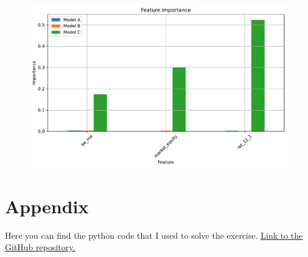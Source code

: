 \documentclass[hidelinks,12pt]{article}
\begin{document}
\FloatBarrier

\section{}
\begin{table}[htbp]
    \centering
    \caption{}
    \resizebox{!}{!}{}
\end{table}

\section{}

\begin{figure}[htbp]
    \centering
    \includegraphics[width=.75\textwidth]{out/4.pdf}
\end{figure}

\section{}
\subsection{}
\begin{table}[htbp]
    \centering
    \caption{}
    \resizebox{!}{!}{}
\end{table}

\subsection{}
\begin{table}[htbp]
    \centering
    \caption{}
    \resizebox{!}{!}{}
\end{table}




\appendix

\section*{Appendix}

Here you can find the python code that I used to solve the exercise. \href{https://github.com/mortezaaghajanzadeh/BDAP/tree/main/Assignments/Assignment4}{Link to the GitHub repository.}
\end{document}
